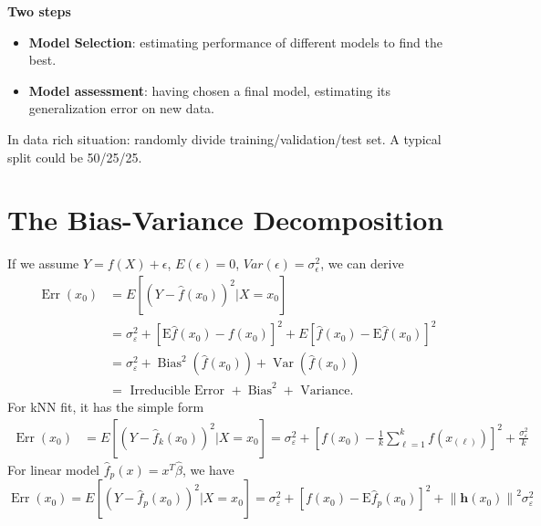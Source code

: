 \noindent\textbf{Two steps}
\begin{itemize}
\item \textbf{Model Selection}: estimating performance of different models to find the best. 
\item \textbf{Model assessment}: having chosen a final model, estimating its generalization error on new data. 
\end{itemize}
In data rich situation: randomly divide training/validation/test set. A typical split could be 
50/25/25. 

\section{The Bias-Variance Decomposition}
If we assume $Y=f(X)+\epsilon$, $E(\epsilon)=0$, $Var(\epsilon)=\sigma_{\epsilon}^2$, we can derive
\begin{align*}
\operatorname{Err}\left(x_{0}\right) &=E\left[\left(Y-\hat{f}\left(x_{0}\right)\right)^{2} | X=x_{0}\right] \\ 
&=\sigma_{\varepsilon}^{2}+\left[\mathrm{E} \hat{f}\left(x_{0}\right)-f\left(x_{0}\right)\right]^{2}+E\left[\hat{f}\left(x_{0}\right)-\mathrm{E} \hat{f}\left(x_{0}\right)\right]^{2} \\ 
&=\sigma_{\varepsilon}^{2}+\operatorname{Bias}^{2}\left(\hat{f}\left(x_{0}\right)\right)+\operatorname{Var}\left(\hat{f}\left(x_{0}\right)\right) \\ 
&=\text { Irreducible Error }+\operatorname{Bias}^{2}+\text { Variance. }
\end{align*}
For kNN fit, it has the simple form
\begin{equation*}
\begin{aligned} \operatorname{Err}\left(x_{0}\right) &=E\left[\left(Y-\hat{f}_{k}\left(x_{0}\right)\right)^{2} | X=x_{0}\right]=\sigma_{\varepsilon}^{2}+\left[f\left(x_{0}\right)-\frac{1}{k} \sum_{\ell=1}^{k} f\left(x_{(\ell)}\right)\right]^{2}+\frac{\sigma_{\varepsilon}^{2}}{k} \end{aligned}
\end{equation*}
For linear model $\hat{f}_p(x)=x^T\hat{\beta}$, we have
\begin{equation*}
    \operatorname{Err}\left(x_{0}\right)=E\left[\left(Y-\hat{f}_{p}\left(x_{0}\right)\right)^{2} | X=x_{0}\right]=\sigma_{\varepsilon}^{2}+\left[f\left(x_{0}\right)-\mathrm{E} \hat{f}_{p}\left(x_{0}\right)\right]^{2}+\left\|\mathbf{h}\left(x_{0}\right)\right\|^{2} \sigma_{\varepsilon}^{2}
\end{equation*}
